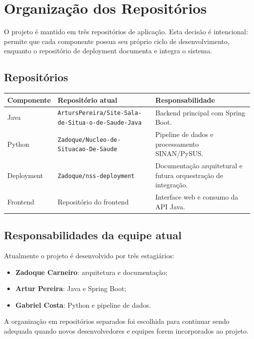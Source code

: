 \section{Organização dos Repositórios}

O projeto é mantido em três repositórios de aplicação. Esta decisão é intencional: permite que cada componente possua seu próprio ciclo de desenvolvimento, enquanto o repositório de deployment documenta e integra o sistema.

\subsection{Repositórios}

\begin{tabularx}{\textwidth}{@{}p{3.2cm}p{5cm}X@{}}
\toprule
\textbf{Componente} & \textbf{Repositório atual} & \textbf{Responsabilidade} \\
\midrule
Java & \texttt{ArtursPereira/Site-Sala-de-Situa-o-de-Saude-Java} & Backend principal com Spring Boot. \\
Python & \texttt{Zadoque/Nucleo-de-Situacao-De-Saude} & Pipeline de dados e processamento SINAN/PySUS. \\
Deployment & \texttt{Zadoque/nss-deployment} & Documentação arquitetural e futura orquestração de integração. \\
Frontend & Repositório do frontend & Interface web e consumo da API Java. \\
\bottomrule
\end{tabularx}

\subsection{Responsabilidades da equipe atual}

Atualmente o projeto é desenvolvido por três estagiários:

\begin{itemize}
    \item \textbf{Zadoque Carneiro}: arquitetura e documentação;
    \item \textbf{Artur Pereira}: Java e Spring Boot;
    \item \textbf{Gabriel Costa}: Python e pipeline de dados.
\end{itemize}

A organização em repositórios separados foi escolhida para continuar sendo adequada quando novos desenvolvedores e equipes forem incorporados ao projeto.

